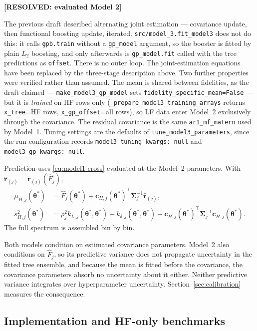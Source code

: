 \documentclass[12pt, letterpaper, oneside]{article}
\newcommand{\resolved}[2]{\par\begingroup\small\color{green!35!black}%
\noindent\textbf{[RESOLVED: #1]}\par\nobreak\noindent #2\par\endgroup}
\begin{document}
\resolved{evaluated Model 2}{The previous draft described alternating joint
estimation --- covariance update, then functional boosting update, iterated.
\texttt{src/model\_3.fit\_model3} does not do this: it calls \texttt{gpb.train}
without a \texttt{gp\_model} argument, so the booster is fitted by plain $L_2$
boosting, and only afterwards is \texttt{gp\_model.fit} called with the tree
predictions as \texttt{offset}. There is no outer loop. The joint-estimation
equations have been replaced by the three-stage description above. Two further
properties were verified rather than assumed. The mean is shared between
fidelities, as the draft claimed --- \texttt{make\_model3\_gp\_model} sets
\texttt{fidelity\_specific\_mean=False} --- but it is \emph{trained} on HF rows
only (\texttt{\_prepare\_model3\_training\_arrays} returns
\texttt{x\_tree}=HF rows, \texttt{x\_gp\_offset}=all rows), so LF data enter
Model~2 exclusively through the covariance. The residual covariance is the
same \texttt{ar1\_mf\_matern} used by Model~1. Tuning settings are the
defaults of \texttt{tune\_model3\_parameters}, since the run configuration
records \texttt{model3\_tuning\_kwargs: null} and
\texttt{model3\_gp\_kwargs: null}.}

Prediction uses \eqref{eq:model1-cross} evaluated at the Model~2 parameters.
With $\widehat{\mathbf{r}}_{(j)}=\mathbf{r}_{(j)}(\widehat F_j)$,
\begin{align}
    \mu_{H,j}(\bm\theta^*)
    &= \widehat F_j(\bm\theta^*)
       +\mathbf{c}_{H,j}(\bm\theta^*)^\top
        \bm\Sigma_j^{-1}\widehat{\mathbf{r}}_{(j)},
       \label{eq:model2-mean} \\
    s^2_{H,j}(\bm\theta^*)
    &= \rho_j^2 k_{L,j}(\bm\theta^*,\bm\theta^*)
       +k_{\delta,j}(\bm\theta^*,\bm\theta^*)
       -\mathbf{c}_{H,j}(\bm\theta^*)^\top
       \bm\Sigma_j^{-1}\mathbf{c}_{H,j}(\bm\theta^*).
       \label{eq:model2-var}
\end{align}
The full spectrum is assembled bin by bin.

Both models condition on estimated covariance parameters. Model~2 also
conditions on $\widehat F_j$, so its predictive variance does not propagate
uncertainty in the fitted tree ensemble, and because the mean is fitted before
the covariance, the covariance parameters absorb no uncertainty about it
either. Neither predictive variance integrates over hyperparameter
uncertainty. Section~\ref{sec:calibration} measures the consequence.

\subsection{Implementation and HF-only benchmarks}
\end{document}
